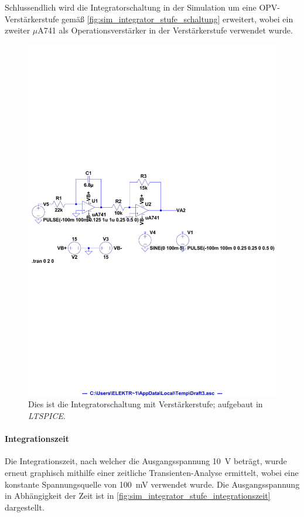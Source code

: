 \documentclass[12pt,english,ngerman]{scrartcl}
\begin{document}
Schlussendlich wird die Integratorschaltung in der Simulation um eine
OPV-Verstärkerstufe gemäß \autoref{fig:sim_integrator_stufe_schaltung}
erweitert, wobei ein zweiter $\mu$A741 als Operationsverstärker in der
Verstärkerstufe verwendet wurde.

\begin{figure}[H]
  \centering
    \includegraphics[width=\linewidth]{./figures/integrator/sim/mit_stufe/schaltung_spannungstypen.pdf}
  \caption{Dies ist die Integratorschaltung mit Verstärkerstufe; aufgebaut in \textit{LTSPICE}.}
  \label{fig:sim_integrator_stufe_schaltung}
\end{figure}

\paragraph{Integrationszeit}
Die Integrationszeit, nach welcher die Ausgangsspannung \SI{10}{\volt} beträgt,
wurde erneut graphisch mithilfe einer zeitliche Transienten-Analyse ermittelt,
wobei eine konstante Spannungsquelle von \SI{100}{\milli\volt} verwendet wurde.
Die Ausgangsspannung in Abhängigkeit der Zeit ist in
\autoref{fig:sim_integrator_stufe_integrationszeit} dargestellt.
\end{document}
